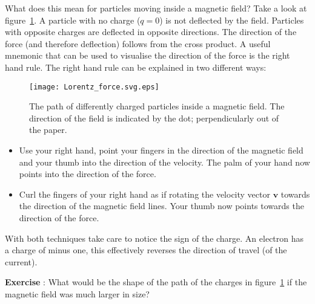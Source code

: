 What does this mean for particles moving inside a magnetic field? Take a look at figure~\ref{fig:lorentz}. A particle with no charge ($q=0$) is not deflected by the field. Particles with opposite charges are deflected in opposite directions. The direction of the force (and therefore deflection) follows from the cross product. A useful mnemonic that can be used to visualise the direction of the force is the right hand rule. The right hand rule can be explained in two different ways:
\begin{figure}\begin{center}
\texttt{[image: Lorentz\_force.svg.eps]}%
\caption{The path of differently charged particles inside a magnetic field. The direction of the field is indicated by the dot; perpendicularly out of the paper.} \label{fig:lorentz}
\end{center}\end{figure}
\begin{itemize}
\item Use your right hand, point your fingers in the direction of the magnetic field and your thumb into the direction of the velocity. The palm of your hand now points into the direction of the force.
\item Curl the fingers of your right hand as if rotating the velocity vector $\mathbf{v}$ towards the direction of the magnetic field lines. Your thumb now points towards the direction of the force.
\end{itemize}
With both techniques take care to notice the sign of the charge. An electron has a charge of minus one, this effectively reverses the direction of travel (of the current).

\begin{shaded}
\textbf{Exercise \theExercise {}} : What would be the shape of the path of the charges in figure~\ref{fig:lorentz} if the magnetic field was much larger in size?\end{shaded}

